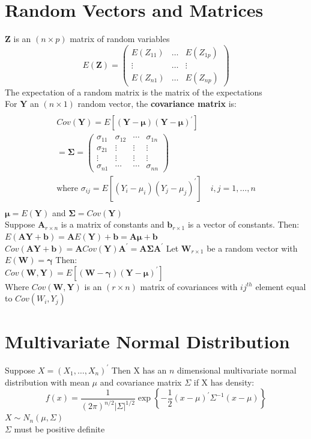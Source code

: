 \documentclass[openany]{book}
\newcommand{\sg}{\sigma}
\newcommand{\bma}{\bm{A}}
\numberwithin{equation}{section}
\begin{document}
\begin{flushleft}
\section{Random Vectors and Matrices}
$\bm{Z}$ is an $(n\times p)$ matrix of random variables
\[E(\bm{Z})=\left(
\begin{array}{ccc}
E(Z_{11})&\dots&E(Z_{1p})\\
\vdots & \dots & \vdots\\
E(Z_{n1}) &\dots& E(Z_{np})
\end{array}
\right)
\]
The expectation of a random matrix is the matrix of the
expectations\\
For $\bm{Y}$ an $(n\times 1)$ random vector, the \textbf{covariance matrix} is:
\begin{multline*}\\
Cov(\bm{Y})=E[(\bm{Y}-\bm{\mu})(\bm{Y}-\bm{\mu})^{'}]\\
=\bm{\Sigma}=\left(
\begin{array}{cccc}
\sigma_{11}&\sigma_{12}&\cdots& \sg_{1n}\\
\sg_{21}& \vdots & \vdots & \vdots\\
\vdots & \vdots & \vdots & \vdots\\
\sg_{n1} &\cdots & \cdots& \sg_{nn} 
\end{array}
\right)\\
\text{where } \sg_{ij}=E[(Y_i-\mu_i)(Y_j-\mu_j)^{'}] \quad i,j=1,\dots,n\\
\end{multline*}
 $\bm{\mu}=E(\bm{Y})$ and $\bm{\Sigma}=Cov(\bm{Y})$\\
Suppose $\bma_{r\times n}$ is a matrix of constants and $\bm{b}_{r \times 1}$ is a vector of constants. Then:\\
$E(\bm{AY}+\bm{b})=\bma E(\bm{Y})+\bm{b}=\bm{A\mu}+\bm{b}$\\
$Cov(\bm{AY}+\bm{b})=\bma Cov(\bm{Y})\bma^{'}=\bma\bm{\Sigma}\bma^{'}$
Let $\bm{W}_{r\times 1}$ be a random vector with $E(\bm{W})=\bm{\gamma}$ Then:\\
$Cov(\bm{W},\bm{Y})=E[(\bm{W}-\bm{\gamma})(\bm{Y}-\bm{\mu})^{'}]$\\
Where $Cov(\bm{W},\bm{Y})$ is an $(r\times n)$ matrix of covariances with $ij^{th}$ element equal to $Cov(W_i,Y_j)$\\
\section{Multivariate Normal Distribution}
Suppose $X=(X_1,\dots,X_n)^{'}$ Then X has an $n$ dimensional multivariate normal distribution with mean $\mu$ and covariance matrix $\Sigma$ if X has density:
\[f(x)=\dfrac{1}{(2\pi)^{n/2}|\Sigma|^{1/2}}\exp\left\{-\dfrac{1}{2}(x-\mu)^{'}\Sigma^{-1}(x-\mu) \right\}
\]
$X\sim N_n(\mu,\Sigma)$\\
$\Sigma$ must be positive definite\\

\end{flushleft}
\end{document}
